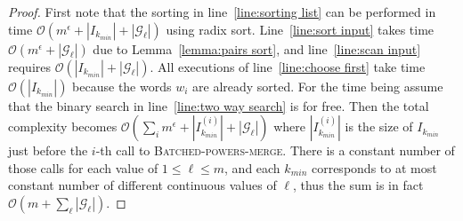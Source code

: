 \documentclass[runningheads]{llncs}
\newcommand{\proc}[1]{\textnormal{\scshape#1}}
\begin{document}
\begin{proof}
First note that the sorting in line~\ref{line:sorting list} can be performed in time $\mathcal{O}(m^\epsilon+\left|I_{k_{min}} \right|+\left|\mathcal{G}_\ell\right|)$ using radix sort. Line~\ref{line:sort input} takes time $\mathcal{O}(m^\epsilon+\left|\mathcal{G}_\ell\right|)$ due to Lemma~\ref{lemma:pairs sort}, and line~\ref{line:scan input} requires $\mathcal{O}(\left|I_{k_{min}}\right|+\left|\mathcal{G}_\ell\right|)$. All executions of line~\ref{line:choose first} take time $\mathcal{O}(\left|I_{k_{min}}\right|)$ because the words $w_i$ are already sorted. For the time being assume that the binary search in line~\ref{line:two way search} is for free. Then the total complexity becomes $\mathcal{O}(\sum_i m^\epsilon + \left|I^{(i)}_{k_{min}} \right|+\left|\mathcal{G}_\ell\right|)$ where $\left|I^{(i)}_{k_{min}}\right|$ is the size of $I_{k_{min}}$ just before the $i$-th call to \proc{Batched-powers-merge}. There is a constant number of those calls for each value of $1\leq\ell\leq m$, and each $k_{min}$ corresponds to at most constant number of different continuous values of $\ell$, thus the sum is in fact $\mathcal{O}(m+\sum_\ell\left|\mathcal{G}_\ell\right|)$.


\end{proof}
\end{document}
